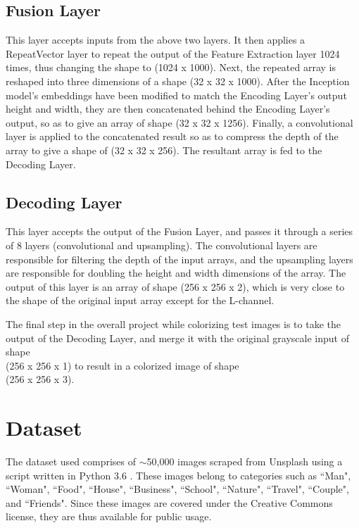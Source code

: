 \documentclass[10pt,twocolumn,letterpaper]{article}
\begin{document}
	\subsection{Fusion Layer}
	This layer accepts inputs from the above two layers. It then applies a RepeatVector layer \cite{Keras} to repeat the output of the Feature Extraction layer 1024 times, thus changing the shape to (1024 x 1000). Next, the repeated array is reshaped into three dimensions of a shape (32 x 32 x 1000). After the Inception model's embeddings have been modified to match the Encoding Layer's output height and width, they are then concatenated behind the Encoding Layer's output, so as to give an array of shape (32 x 32 x 1256). Finally, a convolutional layer is applied to the concatenated result so as to compress the depth of the array to give a shape of (32 x 32 x 256). The resultant array is fed to the Decoding Layer.

	\subsection{Decoding Layer}
	This layer accepts the output of the Fusion Layer, and passes it through a series of 8 layers (convolutional and upsampling). The convolutional layers are responsible for filtering the depth of the input arrays, and the upsampling layers are responsible for doubling the height and width dimensions of the array. The output of this layer is an array of shape (256 x 256 x 2), which is very close to the shape of the original input array except for the L-channel.

	The final step in the overall project while colorizing test images is to take the output of the Decoding Layer, and merge it with the original grayscale input of shape\\(256 x 256 x 1) to result in a colorized image of shape\\(256 x 256 x 3).

	\section{Dataset}
	The dataset used comprises of $\sim$50,000 images scraped from Unsplash \cite{Unsplash} using a script written in Python 3.6 \cite{Python}. These images belong to categories such as ``Man", ``Woman", ``Food", ``House", ``Business", ``School", ``Nature", ``Travel", ``Couple", and ``Friends". Since these images are covered under the Creative Commons license, they are thus available for public usage.
\end{document}
